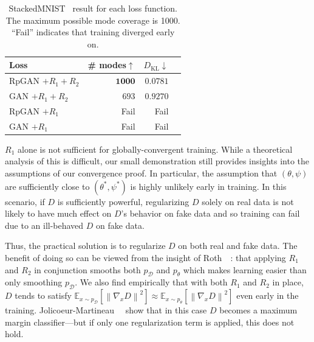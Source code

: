 
\begin{table}[h]
\centering
    \begin{tabular}{ l rrr }
        \toprule
        Loss & \# modes$\uparrow$ & $D_\text{KL}$$\downarrow$ \\
        \midrule
        RpGAN $+ R_1+R_2$ & $\mathbf{1000}$ & $\mathbf{0.0781}$ \\
        GAN $+ R_1+R_2$ & $693$ & $0.9270$ \\
        RpGAN $+ R_1$ & Fail & Fail \\
        GAN $+ R_1$ & Fail & Fail \\
        \bottomrule
    \end{tabular}
    \caption{StackedMNIST~\cite{pacgan} result for each loss function. The maximum possible mode coverage is 1000. ``Fail'' indicates that training diverged early on.}
    \label{tab:loss}
\end{table}

$R_1$ alone is not sufficient for globally-convergent training. While a theoretical analysis of this is difficult, our small demonstration still provides insights into the assumptions of our convergence proof. 
In particular, the assumption that $(\theta,\psi)$ are sufficiently close to $(\theta^*,\psi^*)$ is highly unlikely early in training. In this scenario, if $D$ is sufficiently powerful, regularizing $D$ solely on real data is not likely to have much effect on $D$'s behavior on fake data and so training can fail due to an ill-behaved $D$ on fake data. 

Thus, the practical solution is to regularize $D$ on both real and fake data. The benefit of doing so can be viewed from the insight of Roth~\etal~\cite{r1r2}: that applying $R_1$ and $R_2$ in conjunction smooths both $p_\mathcal{D}$ and $p_\theta$ which makes learning easier than only smoothing $p_\mathcal{D}$. We also find empirically that with both $R_1$ and $R_2$ in place, $D$ tends to satisfy $\mathbb{E}_{x\sim p_\mathcal{D}}\left[\left\| \nabla_x D \right \|^2\right]\approx\mathbb{E}_{x\sim p_\theta}\left[\left\| \nabla_x D \right \|^2\right]$ even early in the training. Jolicoeur-Martineau~\etal~\cite{ganmmc} show that in this case $D$ becomes a maximum margin classifier---but if only one regularization term is applied, this does not hold.


